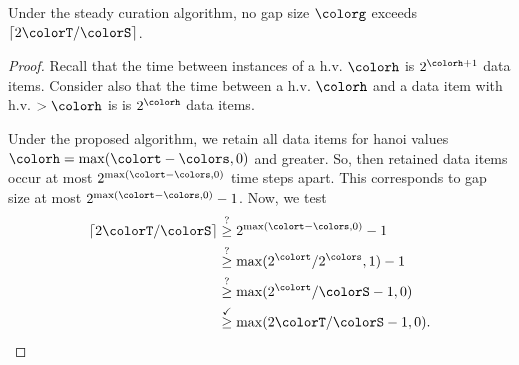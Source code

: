 \begin{theorem}
\label{thm:steady-gap-size}
Under the steady curation algorithm, no gap size $\colorg$ exceeds $\left\lceil 2 \colorT / \colorS \right\rceil$.
\end{theorem}
\begin{proof}
Recall that the time between instances of a h.v. $\colorh$ is $2^{\colorh + 1}$ data items.
Consider also that the time between a h.v. $\colorh$ and a data item with h.v. $>\colorh$ is is $2^{\colorh}$ data items.

Under the proposed algorithm, we retain all data items for hanoi values $\colorh = \max (\colort - \colors, 0)$ and greater.
So, then retained data items occur at most $2^{\max(\colort - \colors, 0)}$ time steps apart.
This corresponds to gap size at most $2^{\max(\colort - \colors, 0)} - 1$.
Now, we test
\begin{align*}
\left\lceil 2 \colorT / \colorS \right\rceil
&\stackrel{?}{\geq}
2^{\max(\colort - \colors, 0)} - 1\\
&\stackrel{?}{\geq}
\max(2^{\colort} / 2^{\colors}, 1) - 1\\
&\stackrel{?}{\geq}
\max(2^{\colort} / \colorS - 1, 0)\\
&\stackrel{\checkmark}{\geq}
\max(2\colorT / \colorS - 1, 0).
\end{align*}
\end{proof}




